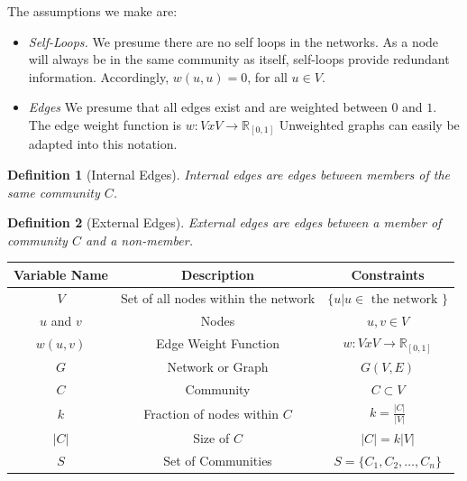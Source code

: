 \documentclass[phd,tocprelim]{cornell}
\newtheorem{definition}{Definition}
\renewcommand{\caption}[1]{\singlespacing\hangcaption{#1}\normalspacing}
\begin{document}
The assumptions we make are:
\begin{itemize}
\item {\it Self-Loops.}  We presume there are no self loops in the networks.  As a node will always be in the same community as itself, self-loops provide redundant information.  Accordingly, $w(u, u) = 0$, for all $u \in V$.
\item {\it Edges} We presume that all edges exist and are weighted between $0$ and $1$.  The edge weight function is $w : VxV \rightarrow \mathbb{R}_{[0, 1]}$  Unweighted graphs can easily be adapted into this notation.
\end{itemize}
\begin{definition}[Internal Edges]
Internal edges are edges between members of the same community $C$.
\end{definition}
\begin{definition}[External Edges]
External edges are edges between a member of community $C$ and a non-member.
\end{definition}

\begin{table}
\caption{Notation}
\begin{center}
\begin{tabular}{|c|c|c|} \hline
Variable Name & Description & Constraints \\ \hline
$V$ & Set of all nodes within the network & $\{u | u \in \mbox{ the network }\}$\\ \hline
$u$ and $v$ & Nodes & $u, v \in V$ \\ \hline
$w(u,v)$ & Edge Weight Function &  $w:VxV \rightarrow \mathbb{R} _{[0, 1]}$ \\ \hline
$G$ & Network or Graph & $G(V,E)$ \\ \hline
$C$ & Community & $C \subset V$ \\ \hline
$k$ & Fraction of nodes within $C$ & $k = \frac{|C|}{|V|}$ \\ \hline
$|C|$ & Size of $C$ & $|C| = k|V |$ \\ \hline
$S$ & Set of Communities & $S = \{C_1,C_2,\dots,C_n\}$\\ \hline
\end{tabular}
\end{center}
\label{table_variables}
\end{table}
\end{document}

